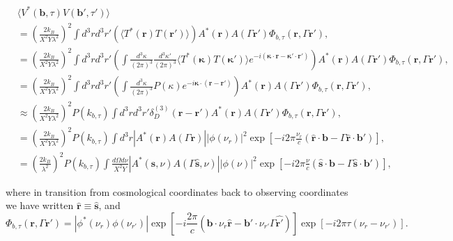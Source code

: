 \documentclass[twocolumn,apj,numberedappendix]{emulateapj}
\renewcommand\[{\begin{equation}}
\renewcommand\]{\end{equation}}
\begin{document}
\begin{widetext}
\begin{equation}
\begin{aligned} & \langle V^{*}(\boldsymbol{b},\tau)V(\boldsymbol{b'},\tau')\rangle\\
 & =\left(\frac{2k_{B}}{X^{2}Y\lambda^{2}}\right)^{2}\int d^{3}rd^{3}r'\left(\langle T^{*}(\boldsymbol{r})T(\boldsymbol{r'})\rangle\right)A^{*}(\boldsymbol{r})A(\Gamma \boldsymbol{r'})\Phi_{b,\tau}(\boldsymbol{r},\Gamma \boldsymbol{r'}),\\
 & =\left(\frac{2k_{B}}{X^{2}Y\lambda^{2}}\right)^{2}\int d^{3}rd^{3}r'\left(\int\frac{d^{3}\kappa}{(2\pi)^{3}}\frac{d^{3}\kappa'}{(2\pi)^{3}}\langle T^{*}(\boldsymbol{\kappa})T(\boldsymbol{\kappa'})\rangle e^{-i(\boldsymbol{\kappa}\cdot \boldsymbol{r}-\boldsymbol{\kappa'}\cdot\boldsymbol{r'})}\right)A^{*}(\boldsymbol{r})A(\Gamma \boldsymbol{r'})\Phi_{b,\tau}(\boldsymbol{r},\Gamma \boldsymbol{r'}),\\
 & =\left(\frac{2k_{B}}{X^{2}Y\lambda^{2}}\right)^{2}\int d^{3}rd^{3}r'\left(\int\frac{d^{3}\kappa}{(2\pi)^{3}}P(\kappa)e^{-i\boldsymbol{\kappa}\cdot(\boldsymbol{r}-\boldsymbol{r'})}\right)A^{*}(\boldsymbol{r})A(\Gamma \boldsymbol{r'})\Phi_{b,\tau}(\boldsymbol{r},\Gamma \boldsymbol{r'}),\\
 & \approx\left(\frac{2k_{B}}{X^{2}Y\lambda^{2}}\right)^{2}P(k_{b,\tau})\int d^{3}rd^{3}r'\delta_{D}^{(3)}(\boldsymbol{r}-\boldsymbol{r'})A^{*}(\boldsymbol{r})A(\Gamma \boldsymbol{r'})\Phi_{b,\tau}(\boldsymbol{r},\Gamma \boldsymbol{r'}),\\
 & =\left(\frac{2k_{B}}{X^{2}Y\lambda^{2}}\right)^{2}P(k_{b,\tau})\int d^{3}r|A^{*}(\boldsymbol{r})A(\Gamma \boldsymbol{r})||\phi(\nu_{r})|^{2}\exp\left[-i2\pi\frac{\nu_{r}}{c}\left(\hat{\boldsymbol{r}}\cdot\boldsymbol{b}-\Gamma \hat{\boldsymbol{r}}\cdot\boldsymbol{b'}\right)\right],\\
 & =\left(\frac{2k_{B}}{\lambda^{2}}\right)^{2}P(k_{b,\tau})\int\frac{d\Omega d\nu}{X^{2}Y}|A^{*}(\hat{\boldsymbol{s}},\nu)A(\Gamma \hat{\boldsymbol{s}},\nu)||\phi(\nu)|^{2}\exp\left[-i2\pi\frac{\nu}{c}\left(\hat{\boldsymbol{s}}\cdot\boldsymbol{b}-\Gamma\hat{\boldsymbol{s}}\cdot\boldsymbol{b'}\right)\right],
\end{aligned}
\label{eq:main}
\end{equation}

where in transition from cosmological coordinates back to observing coordinates we have written $\hat{\boldsymbol{r}}\equiv\hat{\boldsymbol{s}}$, and 
\begin{equation}
\Phi_{b,\tau}(\boldsymbol{r},\Gamma \boldsymbol{r'})=|{\phi^{*}}(\ensuremath{\nu_{r}})\phi(\nu_{r'})|\exp\left[-i\frac{2\pi}{c}\left(\boldsymbol{b}\cdot\nu_{r}\hat{\boldsymbol{r}}-\boldsymbol{b'}\cdot\nu_{r'}\Gamma\hat{\boldsymbol{r'}}\right)\right]\exp\left[-i2\pi\tau\left(\nu_{r}-\nu_{r'}\right)\right].
\end{equation}
\end{widetext}
\end{document}
